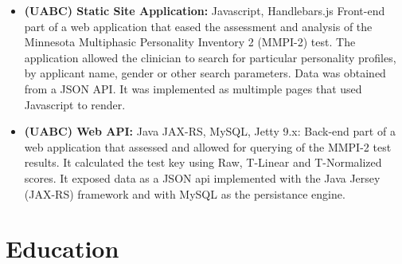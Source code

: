 \documentclass[7pt,a4paper]{moderncv}
\newenvironment{tightitemize}
   {\begin{itemize}
   \setlength{\parskip}{2pt}}
   {\end{itemize}}
\begin{document}
{\begin{tightitemize}
\item \textbf{(UABC) Static Site Application: }{Javascript, Handlebars.js}
	Front-end part of a web application that eased the assessment and analysis of the Minnesota Multiphasic Personality Inventory 2 (MMPI-2) test.
	The application allowed the clinician to search for particular personality profiles, by applicant name, gender or other search parameters.
	Data was obtained from a JSON API. It was implemented as multimple pages that used Javascript to render.

\item \textbf{(UABC) Web API: }{Java JAX-RS, MySQL, Jetty 9.x:}
	Back-end part of a web application that assessed and allowed for querying of the MMPI-2 test results. It calculated the test key using
	Raw, T-Linear and T-Normalized scores. It exposed data as a JSON api implemented with the Java Jersey (JAX-RS) framework and with MySQL as
	the persistance engine.


\end{tightitemize}
\vspace*{-5mm}
\section{Education}
\end{document}
